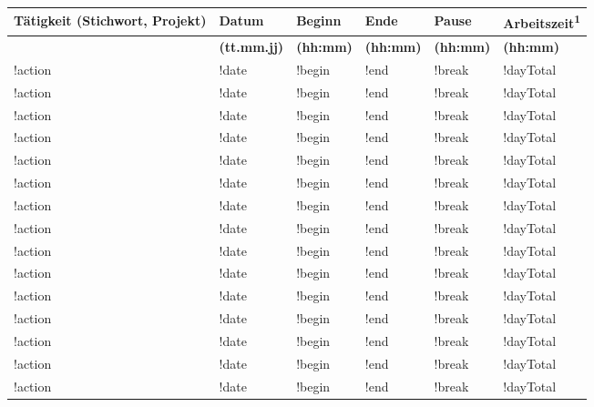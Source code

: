\documentclass[]{scrartcl}
\begin{document}
	\large
	\begin{center}
		\begin{tabular}{| P{6.7cm} | P{2cm} | P{1.8cm} | P{1.8cm} | P{1.8cm} | P{2.4cm} |}
			\hline
			\textbf{T\"atigkeit (Stichwort, Projekt)}
			& \textbf{Datum}
			& \textbf{Beginn}
			& \textbf{Ende}
			& \textbf{Pause}
			& \textbf{Arbeitszeit\textsuperscript{1}}\\
			\hline
			& \textbf{(tt.mm.jj)}
			& \textbf{(hh:mm)}
			& \textbf{(hh:mm)}
			& \textbf{(hh:mm)}
			& \textbf{(hh:mm)}\\
			\hline
			!action
			& !date
			& !begin
			& !end
			& !break
			& !dayTotal\\
			\hline
			!action
			& !date
			& !begin
			& !end
			& !break
			& !dayTotal\\
			\hline
			!action
			& !date
			& !begin
			& !end
			& !break
			& !dayTotal\\
			\hline
			!action
			& !date
			& !begin
			& !end
			& !break
			& !dayTotal\\
			\hline
			!action
			& !date
			& !begin
			& !end
			& !break
			& !dayTotal\\
			\hline
			!action
			& !date
			& !begin
			& !end
			& !break
			& !dayTotal\\
			\hline
			!action
			& !date
			& !begin
			& !end
			& !break
			& !dayTotal\\
			\hline
			!action
			& !date
			& !begin
			& !end
			& !break
			& !dayTotal\\
			\hline
			!action
			& !date
			& !begin
			& !end
			& !break
			& !dayTotal\\
			\hline
			!action
			& !date
			& !begin
			& !end
			& !break
			& !dayTotal\\
			\hline
			!action
			& !date
			& !begin
			& !end
			& !break
			& !dayTotal\\
			\hline
			!action
			& !date
			& !begin
			& !end
			& !break
			& !dayTotal\\
			\hline
			!action
			& !date
			& !begin
			& !end
			& !break
			& !dayTotal\\
			\hline
			!action
			& !date
			& !begin
			& !end
			& !break
			& !dayTotal\\
			\hline
			!action
			& !date
			& !begin
			& !end
			& !break
			& !dayTotal\\

\end{tabular}
\end{center}
\end{document}
